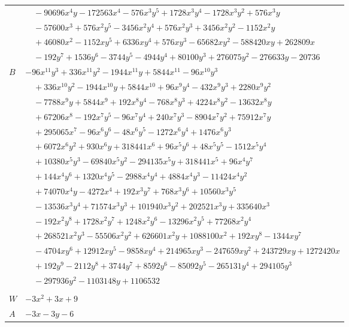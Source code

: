 \documentclass[11pt]{article}
\begin{document}
\begin{longtable}{@{}ll@{}}
 & $\quad -90696x^{4}y-172563x^{4}-576x^{3}y^{5}+1728x^{3}y^{4}-1728x^{3}y^{2}+576x^{3}y$\\
 & $\quad -57600x^{3}+576x^{2}y^{5}-3456x^{2}y^{4}+576x^{2}y^{3}+3456x^{2}y^{2}-1152x^{2}y$\\
 & $\quad +46080x^{2}-1152xy^{5}+6336xy^{4}+576xy^{3}-65682xy^{2}-588420xy+262809x$\\
 & $\quad -192y^{7}+1536y^{6}-3744y^{5}-4944y^{4}+80100y^{3}+276075y^{2}-276633y-20736$\\
$B$ & $-96x^{11}y^{3}+336x^{11}y^{2}-1944x^{11}y+5844x^{11}-96x^{10}y^{3}$\\
 & $\quad +336x^{10}y^{2}-1944x^{10}y+5844x^{10}+96x^{9}y^{4}-432x^{9}y^{3}+2280x^{9}y^{2}$\\
 & $\quad -7788x^{9}y+5844x^{9}+192x^{8}y^{4}-768x^{8}y^{3}+4224x^{8}y^{2}-13632x^{8}y$\\
 & $\quad +67206x^{8}-192x^{7}y^{5}-96x^{7}y^{4}+240x^{7}y^{3}-8904x^{7}y^{2}+75912x^{7}y$\\
 & $\quad +295065x^{7}-96x^{6}y^{6}-48x^{6}y^{5}-1272x^{6}y^{4}+1476x^{6}y^{3}$\\
 & $\quad +6072x^{6}y^{2}+930x^{6}y+318441x^{6}+96x^{5}y^{6}+48x^{5}y^{5}-1512x^{5}y^{4}$\\
 & $\quad +10380x^{5}y^{3}-69840x^{5}y^{2}-294135x^{5}y+318441x^{5}+96x^{4}y^{7}$\\
 & $\quad +144x^{4}y^{6}+1320x^{4}y^{5}-2988x^{4}y^{4}+4884x^{4}y^{3}-11424x^{4}y^{2}$\\
 & $\quad +74070x^{4}y-4272x^{4}+192x^{3}y^{7}+768x^{3}y^{6}+10560x^{3}y^{5}$\\
 & $\quad -13536x^{3}y^{4}+71574x^{3}y^{3}+101940x^{3}y^{2}+202521x^{3}y+335640x^{3}$\\
 & $\quad -192x^{2}y^{8}+1728x^{2}y^{7}+1248x^{2}y^{6}-13296x^{2}y^{5}+77268x^{2}y^{4}$\\
 & $\quad +268521x^{2}y^{3}-55506x^{2}y^{2}+626601x^{2}y+1088100x^{2}+192xy^{8}-1344xy^{7}$\\
 & $\quad -4704xy^{6}+12912xy^{5}-9858xy^{4}+214965xy^{3}-247659xy^{2}+243729xy+1272420x$\\
 & $\quad +192y^{9}-2112y^{8}+3744y^{7}+8592y^{6}-85092y^{5}-265131y^{4}+294105y^{3}$\\
 & $\quad -297936y^{2}-1103148y+1106532$\\
\addlinespace[3pt]
\multicolumn{2}{@{}l}{$i=19$, $m=1$, neighbours $39,2,6,9,14$}\\
$W$ & $-3x^{2}+3x+9$\\
$A$ & $-3x-3y-6$\\

\end{longtable}
\end{document}
